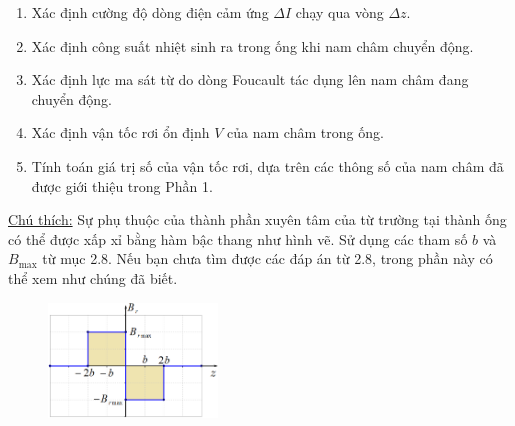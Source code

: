 \begin{enumerate}
  \item Xác định cường độ dòng điện cảm ứng $\Delta I$ chạy qua vòng $\Delta z$.
  \item Xác định công suất nhiệt sinh ra trong ống khi nam châm chuyển động.
  \item Xác định lực ma sát từ do dòng Foucault tác dụng lên nam châm đang chuyển động.
  \item Xác định vận tốc rơi ổn định $V$ của nam châm trong ống.
  \item Tính toán giá trị số của vận tốc rơi, dựa trên các thông số của nam châm đã được giới thiệu trong Phần 1.
\end{enumerate}
\underline{Chú thích:} Sự phụ thuộc của thành phần xuyên tâm của từ trường tại thành ống có thể được xấp xỉ bằng hàm bậc thang như hình vẽ. Sử dụng các tham số $b$ và $B_{\text{max}}$ từ mục 2.8. Nếu bạn chưa tìm được các đáp án từ 2.8, trong phần này có thể xem như chúng đã biết.\\
\begin{figure}[H]
  \centering
  \vspace{-0.5cm}
  \includegraphics[width=0.4\textwidth]{Figures/Problems/Fig 2.10.png}
\end{figure}
